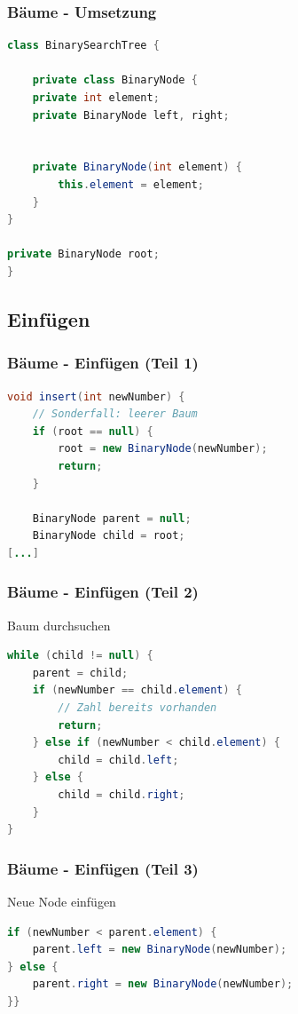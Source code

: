 \begin{frame}[fragile]
\frametitle{Bäume - Umsetzung}
\begin{lstlisting}[language=java]
class BinarySearchTree {

    private class BinaryNode {
    private int element;
    private BinaryNode left, right;


    private BinaryNode(int element) {
        this.element = element;
    }
}

private BinaryNode root;
}

\end{lstlisting}

\end{frame}

\subsection{Einfügen}
\begin{frame}[fragile]
\frametitle{Bäume - Einfügen (Teil 1)}

\begin{lstlisting}[language=java,basicstyle=\ttfamily\footnotesize,breaklines=true]
void insert(int newNumber) {
    // Sonderfall: leerer Baum
    if (root == null) {
        root = new BinaryNode(newNumber);
        return;
    }

    BinaryNode parent = null;
    BinaryNode child = root;
[...]
\end{lstlisting}

\end{frame}

\begin{frame}[fragile]
\frametitle{Bäume - Einfügen (Teil 2)}
Baum durchsuchen
\begin{lstlisting}[language=java,basicstyle=\ttfamily\footnotesize,breaklines=true]
while (child != null) {
    parent = child;
    if (newNumber == child.element) {
        // Zahl bereits vorhanden
        return;
    } else if (newNumber < child.element) {
        child = child.left;
    } else {
        child = child.right;
    }
}
\end{lstlisting}

\end{frame}

\begin{frame}[fragile]
\frametitle{Bäume - Einfügen (Teil 3)}
Neue Node einfügen
\begin{lstlisting}[language=java,basicstyle=\ttfamily\footnotesize,breaklines=true]
if (newNumber < parent.element) {
    parent.left = new BinaryNode(newNumber);
} else {
    parent.right = new BinaryNode(newNumber);
}}
\end{lstlisting}

\end{frame}


